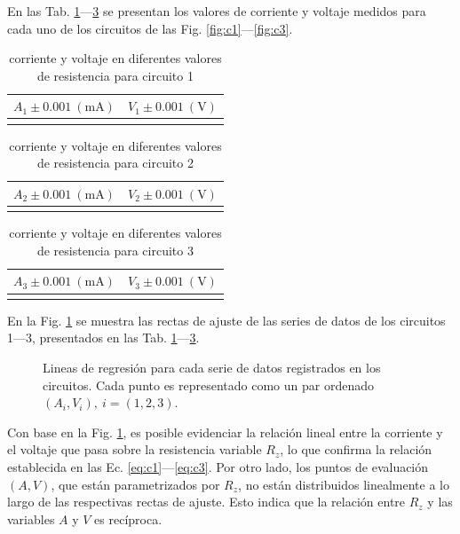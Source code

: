 \def\tabla#1#2{
  \begin{table}[H]
    \centering
    \caption{#2}
    \begin{tabular}{|c|c|}
      \hline
      $A_#1 \pm0.001\ (\unit{\milli\ampere})$ & $V_#1 \pm0.001\ (\unit{\volt})$ \\ \hline
       \\ \hline
    \end{tabular}
    \label{tab:#1}
  \end{table}
}

En las Tab. \ref{tab:1}---\ref{tab:3} se presentan los valores de corriente y
voltaje medidos para cada uno de los circuitos de las Fig. \ref{fig:c1}---\ref{fig:c3}.
\tabla{1}{corriente y voltaje en diferentes valores de resistencia para circuito 1}
\tabla{2}{corriente y voltaje en diferentes valores de resistencia para circuito 2}
\tabla{3}{corriente y voltaje en diferentes valores de resistencia para circuito 3}


En la Fig. \ref{fig:lineas} se muestra las rectas de ajuste de las series de datos de
los circuitos 1---3, presentados en las Tab. \ref{tab:1}---\ref{tab:3}.
\begin{figure}[H]
  \centering
  \caption{Lineas de regresión para cada serie de datos registrados en los
  circuitos. Cada punto es representado como un par ordenado $(A_i,V_i),\ i=(1,2,3)$.}
  \label{fig:lineas}
\end{figure}

Con base en la Fig. \ref{fig:lineas}, es posible evidenciar la relación lineal entre
la corriente y el voltaje que pasa sobre la resistencia variable $R_z$, lo que
confirma la relación establecida en las Ec. \ref{eq:c1}---\ref{eq:c3}. Por otro lado,
los puntos de evaluación $(A,V)$, que están parametrizados por $R_z$, no están
distribuidos linealmente a lo largo de las respectivas rectas de ajuste. Esto indica
que la relación entre $R_z$ y las variables $A$ y $V$ es recíproca.

